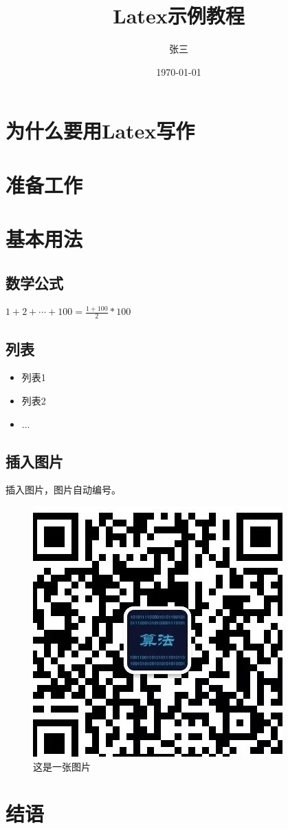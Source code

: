 \documentclass[12pt]{article}
\title{Latex示例教程}
\author{张三}
\date{\today}
\begin{document}
\doublespacing
\maketitle

\section{为什么要用Latex写作}

\section{准备工作}

\section{基本用法}
\subsection{数学公式}
$ 1+2+\cdots+100=\frac{1+100}{2}*100$

\subsection{列表}

\begin{itemize}
    \item 列表1
    \item 列表2
    \item ...
\end{itemize}

\subsection{插入图片}
插入图片，图片自动编号。
\begin{figure}[H]
    \centering
    \includegraphics{logo.jpg}
    \caption{这是一张图片}
    \label{}
\end{figure}

\section{结语}
\end{document}
